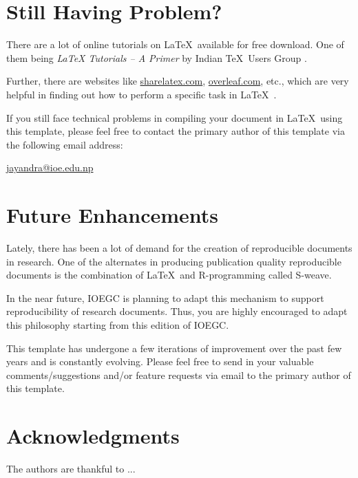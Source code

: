 \documentclass[fleqn, 10pt, twoside, blindreview]{IOEGC}
\begin{document}
\section*{Still Having Problem?} 
There are a lot of online tutorials on \LaTeX\ available for free download. 
One of them being \textit{LaTeX Tutorials -- A Primer} by Indian \TeX\ Users 
Group \cite{ltxprimer}.

Further, there are websites like \url{sharelatex.com}, \url{overleaf.com}, etc.,
 which are very helpful
in finding out how to perform a specific task in \LaTeX\ .

If you still face technical problems in compiling your document in \LaTeX\ using
this template, please feel free to contact the primary author of this template 
via the following email address:

\centerline{\url{jayandra@ioe.edu.np}}

\section*{Future Enhancements}
Lately, there has been a lot of demand for the creation of reproducible 
documents in research. One of the alternates in producing publication quality 
reproducible documents is the combination of \LaTeX\ and R-programming called 
S-weave. 

In the near future, IOEGC is planning to adapt this mechanism to support 
reproducibility of research documents. Thus, you are highly encouraged to adapt 
this philosophy starting from this edition of IOEGC.

This template has undergone a few iterations of improvement over the past few 
years and is constantly evolving. Please feel free to send in your valuable 
comments/suggestions and/or feature requests via email to the primary author 
of this template.

\section*{Acknowledgments} 
The authors are thankful to ...




\vfill\null
\end{document}
